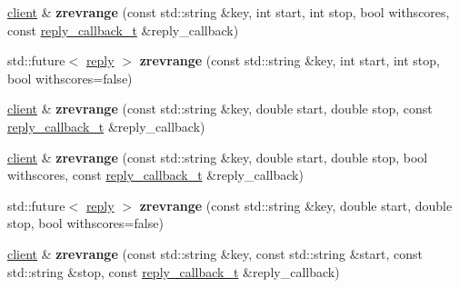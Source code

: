 \begin{DoxyCompactItemize}
\item 
\mbox{\label{classcpp__redis_1_1client_a37bfbe4848350144e7899c6d1e63653b}} 
\hyperlink{classcpp__redis_1_1client}{client} \& {\bfseries zrevrange} (const std\+::string \&key, int start, int stop, bool withscores, const \hyperlink{classcpp__redis_1_1client_a061a1140d36d2eaeda82b09a0bb3f9f2}{reply\+\_\+callback\+\_\+t} \&reply\+\_\+callback)
\item 
\mbox{\label{classcpp__redis_1_1client_a001bdf0f597d386202b0aab116657055}} 
std\+::future$<$ \hyperlink{classcpp__redis_1_1reply}{reply} $>$ {\bfseries zrevrange} (const std\+::string \&key, int start, int stop, bool withscores=false)
\item 
\mbox{\label{classcpp__redis_1_1client_a7b20d0dc47cf4fb40220e51408876d6d}} 
\hyperlink{classcpp__redis_1_1client}{client} \& {\bfseries zrevrange} (const std\+::string \&key, double start, double stop, const \hyperlink{classcpp__redis_1_1client_a061a1140d36d2eaeda82b09a0bb3f9f2}{reply\+\_\+callback\+\_\+t} \&reply\+\_\+callback)
\item 
\mbox{\label{classcpp__redis_1_1client_ac03871ced545f10c9f277fd5fc20f0a0}} 
\hyperlink{classcpp__redis_1_1client}{client} \& {\bfseries zrevrange} (const std\+::string \&key, double start, double stop, bool withscores, const \hyperlink{classcpp__redis_1_1client_a061a1140d36d2eaeda82b09a0bb3f9f2}{reply\+\_\+callback\+\_\+t} \&reply\+\_\+callback)
\item 
\mbox{\label{classcpp__redis_1_1client_a85aa18b29763edd1d93c4b463b6b3a51}} 
std\+::future$<$ \hyperlink{classcpp__redis_1_1reply}{reply} $>$ {\bfseries zrevrange} (const std\+::string \&key, double start, double stop, bool withscores=false)
\item 
\mbox{\label{classcpp__redis_1_1client_ab72a94b6f16cb23cf39275bfc9e35385}} 
\hyperlink{classcpp__redis_1_1client}{client} \& {\bfseries zrevrange} (const std\+::string \&key, const std\+::string \&start, const std\+::string \&stop, const \hyperlink{classcpp__redis_1_1client_a061a1140d36d2eaeda82b09a0bb3f9f2}{reply\+\_\+callback\+\_\+t} \&reply\+\_\+callback)
\item 

\end{DoxyCompactItemize}
